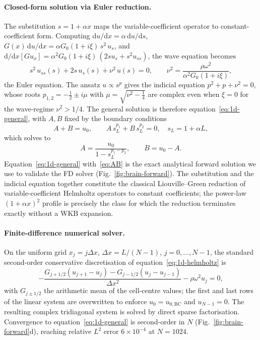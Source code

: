 \documentclass[11pt,letterpaper]{article}
\begin{document}
\paragraph{Closed-form solution via Euler reduction.}
The substitution $s = 1+\alpha x$ maps the variable-coefficient operator
to constant-coefficient form. Computing
$\mathrm{d}u/\mathrm{d}x = \alpha\,\mathrm{d}u/\mathrm{d}s$,
$G(x)\,\mathrm{d}u/\mathrm{d}x = \alpha G_{0}(1+i\xi)\,s^{2}\,u_{s}$, and
$\mathrm{d}/\mathrm{d}x[G u_{x}] =
\alpha^{2}G_{0}(1+i\xi)\,(2s u_{s}+s^{2}u_{ss})$, the wave equation
becomes
\begin{equation}
s^{2}\,u_{ss}(s) + 2 s\,u_{s}(s) + \nu^{2}\,u(s) = 0,
\qquad
\nu^{2} = \frac{\rho\omega^{2}}{\alpha^{2}G_{0}(1+i\xi)},
\label{eq:euler}
\end{equation}
the Euler equation. The ansatz $u\propto s^{p}$ gives the indicial
equation $p^{2}+p+\nu^{2}=0$, whose roots
$p_{1,2}=-\tfrac{1}{2}\pm i\mu$ with $\mu=\sqrt{\nu^{2}-\tfrac{1}{4}}$ are
complex even when $\xi=0$ for the wave-regime $\nu^{2}>1/4$. The general
solution is therefore equation~\eqref{eq:1d-general}, with $A,B$ fixed by
the boundary conditions
\begin{equation}
A + B = u_{0},\qquad
A\,s_{L}^{p_{1}} + B\,s_{L}^{p_{2}} = 0,\quad s_{L}=1+\alpha L,
\label{eq:bcs}
\end{equation}
which solves to
\begin{equation}
A = \frac{u_{0}}{1 - s_{L}^{p_{1}-p_{2}}},\qquad
B = u_{0} - A.
\label{eq:AB}
\end{equation}
Equation~\eqref{eq:1d-general} with~\eqref{eq:AB} is the exact analytical
forward solution we use to validate the FD solver
(Fig.~\ref{fig:brain-forward}). The substitution and the indicial equation
together constitute the classical Liouville--Green reduction of
variable-coefficient Helmholtz operators to constant coefficients; the
power-law $(1+\alpha x)^{2}$ profile is precisely the class for which the
reduction terminates exactly without a WKB expansion.

\paragraph{Finite-difference numerical solver.}
On the uniform grid $x_{j}=j\Delta x$, $\Delta x=L/(N\!-\!1)$,
$j=0,\dots,N\!-\!1$, the standard second-order conservative
discretisation of equation~\eqref{eq:1d-helmholtz} is
\begin{equation}
-\frac{G_{j+1/2}(u_{j+1}-u_{j}) - G_{j-1/2}(u_{j}-u_{j-1})}{\Delta x^{2}}
- \rho\omega^{2}u_{j} = 0,
\label{eq:fd-1d}
\end{equation}
with $G_{j\pm 1/2}$ the arithmetic mean of the cell-centre values; the
first and last rows of the linear system are overwritten to enforce
$u_{0}=u_{0,\mathrm{BC}}$ and $u_{N-1}=0$. The resulting complex tridiagonal
system is solved by direct sparse factorisation. Convergence to
equation~\eqref{eq:1d-general} is second-order in $N$
(Fig.~\ref{fig:brain-forward}d), reaching relative $L^{2}$ error
$6\!\times\!10^{-4}$ at $N=1024$.
\end{document}
